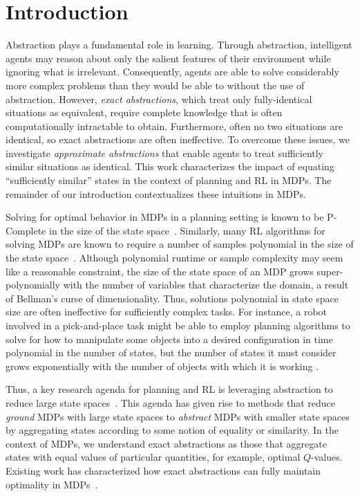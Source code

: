 \section{Introduction}
\label{sec:intro}

Abstraction plays a fundamental role in learning. Through abstraction, intelligent agents may reason about only the salient features of their environment while ignoring what is irrelevant. Consequently, agents are able to solve considerably more complex problems than they would be able to without the use of abstraction. However, \textit{exact abstractions}, which treat only fully-identical situations as equivalent, require complete knowledge that is often computationally intractable to obtain. Furthermore, often no two situations are identical, so exact abstractions are often ineffective. To overcome these issues, we investigate \textit{approximate abstractions} that enable agents to treat sufficiently similar situations as identical. This work characterizes the impact of equating ``sufficiently similar'' states in the context of planning and \ac{RL} in \acp{MDP}. The remainder of our introduction contextualizes these intuitions in \acp{MDP}.

Solving for optimal behavior in \acp{MDP} in a planning setting is known to be P-Complete in the size of the state space~\cite{papadimitriou1987complexity,littman1995complexity}. Similarly, many \ac{RL} algorithms for solving \acp{MDP} are known to require a number of samples polynomial in the size of the state space~\cite{strehl2009reinforcement}. Although polynomial runtime or sample complexity may seem like a reasonable constraint, the size of the state space of an \ac{MDP} grows super-polynomially with the number of variables that characterize the domain, a result of Bellman's curse of dimensionality. Thus, solutions polynomial in state space size are often ineffective for sufficiently complex tasks. For instance, a robot involved in a pick-and-place task might be able to employ planning algorithms to solve for how to manipulate some objects into a desired configuration in time polynomial in the number of states, but the number of states it must consider grows exponentially with the number of objects with which it is working \cite{abel2015goal}.

Thus, a key research agenda for planning and \ac{RL} is leveraging abstraction to reduce large state spaces~\cite{andre2002state,jong2005state,dietterich2000hierarchical,Bean2011}. This agenda has given rise to methods that reduce \textit{ground} \acp{MDP} with large state spaces to \textit{abstract} MDPs with smaller state spaces by aggregating states according to some notion of equality or similarity. In the context of \acp{MDP}, we understand exact abstractions as those that aggregate states with equal values of particular quantities, for example, optimal $Q$-values. Existing work has characterized how exact abstractions can fully maintain optimality in \acp{MDP}~\cite{li2006towards,dean1997modelmin}. 

